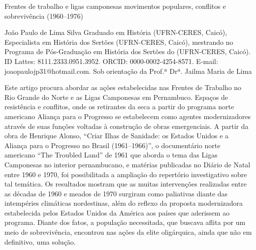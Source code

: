 \begin{refsection}
    \renewcommand{\thefigure}{\arabic{figure}}
    
    \chapterTwoLines
    {Frentes de trabalho e ligas camponesas}
    {movimentos populares, conflitos e sobrevivência (1960--1976)}
    \label{chap:frentestrab}
    
    \articleAuthor
    {João Paulo de Lima Silva}
    {Graduado em História (UFRN-CERES, Caicó), Especialista em História dos Sertões (UFRN-CERES, Caicó), mestrando no Programa de Pós-Graduação em História dos Sertões do (UFRN-CERES, Caicó). ID Lattes: 8111.2333.0951.3952. ORCID: 0000-0002-4254-8571. E-mail: joaopaulojp31@hotmail.com. Sob orientação da Prof.ª Drª. Jailma Maria de Lima}

    \begin{galoResumo}
        Este artigo procura abordar as ações estabelecidas nas Frentes de Trabalho no Rio Grande do Norte e as Ligas Camponesas em Pernambuco. Espaços de resistência e conflitos, onde os retirantes da seca a partir do programa norte americano Aliança para o Progresso se estabelecem como agentes modernizadores através de suas funções voltadas à construção de obras emergenciais. A partir da obra de Henrique Alonso, ``Criar Ilhas de Sanidade: os Estados Unidos e a Aliança para o Progresso no Brasil (1961--1966)'', o documentário norte americano ``The Troubled Land'' de 1961 que aborda o tema das Ligas Camponesas no interior pernambucano, e matérias publicadas no Diário de Natal entre 1960 e 1970, foi possibilitada a ampliação do repertório investigativo sobre tal temática. Os resultados mostram que as muitas intervenções realizadas entre as décadas de 1960 e meados de 1970 surgiram como paliativas diante das intempéries climáticas nordestinas, além do reflexo da proposta modernizadora estabelecida pelos Estados Unidos da América aos países que aderissem ao programa. Diante dos fatos, a população necessitada, que buscava aflita por um meio de sobrevivência, encontrou nas ações da elite oligárquica, ainda que não em definitivo, uma solução.
    \end{galoResumo}
    

\end{refsection}
